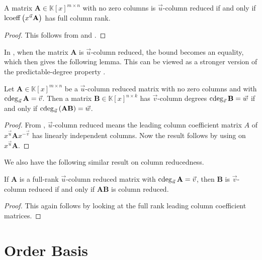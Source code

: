\begin{cor}
\label{cor:columnReducedLeadingCoefficient}A matrix $\mathbf{A}\in\mathbb{K}\left[x\right]^{m\times n}$
with no zero columns is $\vec{u}$-column reduced if and only if $\operatorname{lcoeff}\left(x^{\vec{u}}\mathbf{A}\right)$
has full column rank.\end{cor}
\begin{proof}
This follows from  and
.


\end{proof}
In , when the matrix $\mathbf{A}$
is $\vec{u}$-column reduced, the bound becomes an equality, which
then gives the following lemma. This can be viewed as a stronger version
of the predictable-degree property \citep{kailath:1980}.
\begin{lem}
\label{lem:predictableDegree}Let $\mathbf{A}\in\mathbb{K}\left[x\right]^{m\times n}$
be a $\vec{u}$-column reduced matrix with no zero columns and with
$\cdeg_{\vec{u}}\mathbf{A}=\vec{v}$. Then a matrix $\mathbf{B}\in\mathbb{K}\left[x\right]^{n\times k}$
has $\vec{v}$-column degrees $\cdeg_{\vec{v}}\mathbf{B}=\vec{w}$
if and only if $\cdeg_{\vec{u}}\left(\mathbf{A}\mathbf{B}\right)=\vec{w}$. \end{lem}
\begin{proof}
From , $\vec{u}$-column
reduced means the leading column coefficient matrix $A$ of $x^{\vec{u}}\mathbf{A}x^{-\vec{v}}$
has linearly independent columns. Now the result follows by using
 on $x^{\vec{u}}\mathbf{A}$.
\end{proof}
We also have the following similar result on column reducedness.
\begin{lem}
\label{lem:predictableColumnReducedness}If $\mathbf{A}$ is a full-rank
$\vec{u}$-column reduced matrix with $\cdeg_{\vec{u}}\mathbf{A}=\vec{v}$,
then $\mathbf{B}$ is $\vec{v}$-column reduced if and only if $\mathbf{A}\mathbf{B}$
is column reduced.\end{lem}
\begin{proof}
This again follows by looking at the full rank leading column coefficient
matrices.
\end{proof}

\section{Order Basis}

